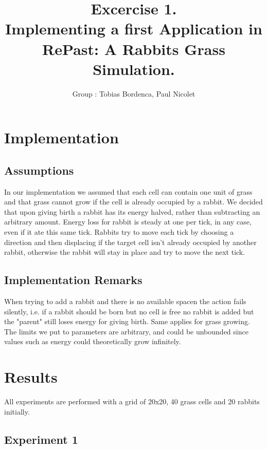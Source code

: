 \documentclass[11pt]{article}
\title{\bf Excercise 1.\\ Implementing a first Application in RePast: A Rabbits Grass Simulation.}
\author{Group \textnumero 1: Tobias Bordenca, Paul Nicolet}
\begin{document}
\maketitle

\section{Implementation}

\subsection{Assumptions}
In our implementation we assumed that each cell can contain one unit of grass and that grass cannot grow if the cell is already occupied by a rabbit. We decided that upon giving birth a rabbit has its energy halved, rather than subtracting an arbitrary amount. Energy loss for rabbit is steady at one per tick, in any case, even if it ate this same tick. Rabbits try to move each tick by choosing a direction and then displacing if the target cell isn't already occupied by another rabbit, otherwise the rabbit will stay in place and try to move the next tick.

\subsection{Implementation Remarks}
When trying to add a rabbit and there is no available spacen the action fails silently, i.e. if a rabbit should be born but no cell is free no rabbit is added but the "parent" still loses energy for giving birth. Same applies for grass growing. \\
The limits we put to parameters are arbitrary, and could be unbounded since values such as energy could theoretically grow infinitely.

\section{Results}

All experiments are performed with a grid of 20x20, 40 grass cells and 20 rabbits initially.

\subsection{Experiment 1}
\end{document}
